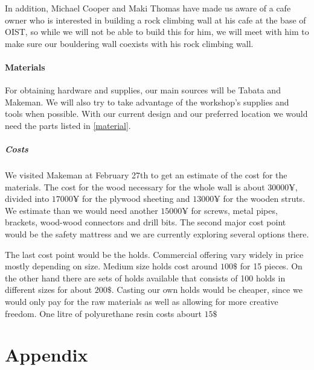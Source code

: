 \documentclass[a4paper, 12pt]{scrartcl}
\begin{document}
In addition, Michael Cooper and Maki Thomas have made us aware of a cafe owner who is interested in building a rock climbing wall at his cafe at the base of OIST, so while we will not be able to build this for him, we will meet with him to make sure our bouldering wall coexists with his rock climbing wall.

\paragraph{Materials}
For obtaining hardware and supplies, our main sources will be Tabata and Makeman. We will also try to take advantage of the workshop's supplies and tools when possible. With our current design and our preferred location we would need the parts listed in \cref{material}.

\subparagraph{Costs}
We visited Makeman at February 27th to get an estimate of the cost for the materials. The cost for the wood necessary for the whole wall is about $30000\yen$, divided into $17000\yen$ for the plywood sheeting and $13000\yen$ for the wooden struts. We estimate than we would need another $15000\yen$ for screws, metal pipes, brackets, wood-wood connectors and drill bits.
The second major cost point would be the safety mattress and we are currently exploring several options there.

The last cost point would be the holds. Commercial offering vary widely in price mostly depending on size. Medium size holds cost around $100\$$ for 15 pieces. On the other hand there are sets of holds available that consists of 100 holds in different sizes for about $200\$$. Casting our own holds would be cheaper, since we would only pay for the raw materials as well as allowing for more creative freedom. One litre of polyurethane resin costs abourt $15\$$

\newpage
\section*{Appendix}
\begin{figure}[ht]
\end{figure}
\end{document}

